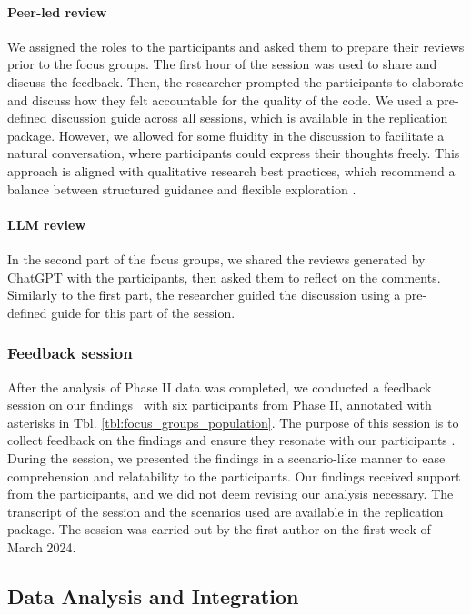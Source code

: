 \paragraph*{Peer-led review} We assigned the roles to the participants and asked them to prepare their reviews prior to the focus groups. The first hour of the session was used to share and discuss the feedback. Then, the researcher prompted the participants to elaborate and discuss how they felt accountable for the quality of the code. We used a pre-defined discussion guide across all sessions, which is available in the replication package. However, we allowed for some fluidity in the discussion to facilitate a natural conversation, where participants could express their thoughts freely. This approach is aligned with qualitative research best practices, which recommend a balance between structured guidance and flexible exploration \citep{patton2014qualitative}.

\paragraph*{LLM review} In the second part of the focus groups, we shared the reviews generated by ChatGPT with the participants, then asked them to reflect on the comments. Similarly to the first part, the researcher guided the discussion using a pre-defined guide for this part of the session.

\subsubsection{Feedback session} After the analysis of Phase II data was completed, we conducted a feedback session on our findings~\citep{alami2022scrum} with six participants from Phase II, annotated with asterisks in Tbl. \ref{tbl:focus_groups_population}. The purpose of this session is to collect feedback on the findings and ensure they resonate with our participants \citep{birt2016member}. During the session, we presented the findings in a scenario-like manner to ease comprehension and relatability to the participants. Our findings received support from the participants, and we did not deem revising our analysis necessary. The transcript of the session and the scenarios used are available in the replication package. The session was carried out by the first author on the first week of March 2024.

\subsection{Data Analysis and Integration} 


